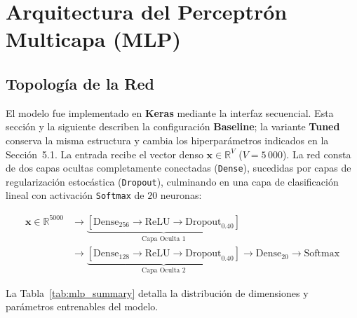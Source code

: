 \documentclass[12pt, a4paper]{article}
\begin{document}
\section{Arquitectura del Perceptrón Multicapa (MLP)}

\subsection{Topología de la Red}

El modelo fue implementado en \textbf{Keras} mediante la interfaz secuencial. Esta sección y la siguiente describen la configuración \textbf{Baseline}; la variante \textbf{Tuned} conserva la misma estructura y cambia los hiperparámetros indicados en la Sección~5.1. La entrada recibe el vector denso $\mathbf{x} \in \mathbb{R}^V$ ($V = 5\,000$). La red consta de dos capas ocultas completamente conectadas (\texttt{Dense}), sucedidas por capas de regularización estocástica (\texttt{Dropout}), culminando en una capa de clasificación lineal con activación \texttt{Softmax} de $20$ neuronas:

\begin{align*}
    \mathbf{x} \in \mathbb{R}^{5000} &\longrightarrow
    \underbrace{[\text{Dense}_{256} \to \text{ReLU} \to \text{Dropout}_{0.40}]}_{\text{Capa Oculta 1}} \\
    &\longrightarrow \underbrace{[\text{Dense}_{128} \to \text{ReLU} \to \text{Dropout}_{0.40}]}_{\text{Capa Oculta 2}}
    \longrightarrow \text{Dense}_{20} \to \text{Softmax}
\end{align*}

La Tabla~\ref{tab:mlp_summary} detalla la distribución de dimensiones y parámetros entrenables del modelo.
\end{document}
